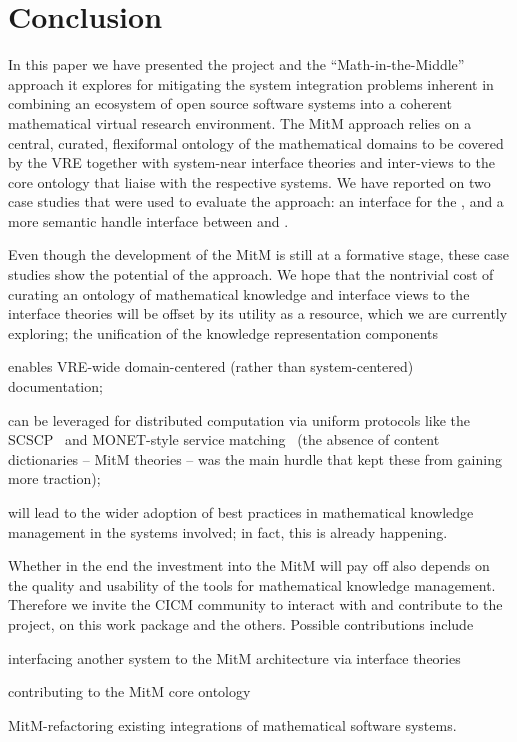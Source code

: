 \section{Conclusion}\label{sec:concl}
In this paper we have presented the \ODK project and the ``Math-in-the-Middle'' approach
it explores for mitigating the system integration problems inherent in combining an ecosystem
of open source software systems into a coherent mathematical virtual research environment.
The MitM approach relies on a central, curated, flexiformal ontology of the mathematical
domains to be covered by the VRE together with system-near interface theories and
inter-views to the core ontology that liaise with the respective systems. We have reported
on two case studies that were used to evaluate the approach: an interface for the \LMFDB,
and a more semantic handle interface between \GAP and \Sage.

Even though the development of the MitM is still at a formative stage, these case studies
show the potential of the approach. We hope that the nontrivial cost of curating an
ontology of mathematical knowledge and interface views to the interface theories will be offset
by its utility as a resource, which we are currently exploring; the unification of the
knowledge representation components
\begin{compactenum}
\item enables VRE-wide domain-centered (rather than system-centered) documentation;
\item can be leveraged for distributed computation via uniform protocols like the
  SCSCP~\cite{HorRoz:ossp09} and MONET-style service
  matching~\cite{CaprottiEtAl:MathServiceMatching04:tr} (the absence of content
  dictionaries -- MitM theories -- was the main hurdle that kept these from gaining more
  traction);
\item will lead to the wider adoption of best practices in
  mathematical knowledge management in the systems involved; in
  fact, this is already happening.
\end{compactenum}
Whether in the end the investment into the MitM will pay off also depends on the quality
and usability of the tools for mathematical knowledge management. Therefore we invite the
CICM community to interact with and contribute to the \ODK project, on this work package
and the others. Possible contributions include
\begin{compactenum}
\item interfacing another system to the MitM architecture via interface theories
\item contributing to the MitM core ontology 
\item MitM-refactoring existing integrations of mathematical software systems.
\end{compactenum}

